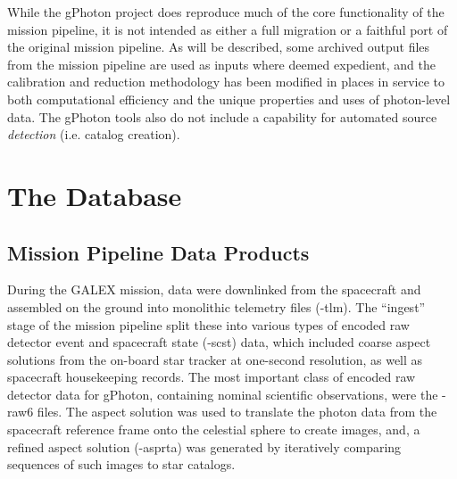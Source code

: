 \documentclass[iop]{emulateapj}
\begin{document}
While the gPhoton project does reproduce much of the core functionality of the mission pipeline, it is not intended as either a full migration or a faithful port of the original mission pipeline. As will be described, some archived output files from the mission pipeline are used as inputs where deemed expedient, and the calibration and reduction methodology has been modified in places in service to both computational efficiency and the unique properties and uses of photon-level data. The gPhoton tools also do not include a capability for automated source \emph{detection} (i.e. catalog creation).

\section{The Database}
\label{database}
\subsection{Mission Pipeline Data Products}
During the GALEX mission, data were downlinked from the spacecraft and assembled on the ground into monolithic telemetry files (-tlm). The ``ingest'' stage of the mission pipeline split these into various types of encoded raw detector event and spacecraft state (-scst) data, which included coarse aspect solutions from the on-board star tracker at one-second resolution, as well as spacecraft housekeeping records. The most important class of encoded raw detector data for gPhoton, containing nominal scientific observations, were the -raw6 files. The aspect solution was used to translate the photon data from the spacecraft reference frame onto the celestial sphere to create images, and, a refined aspect solution (-asprta) was generated by iteratively comparing sequences of such images to star catalogs.
\end{document}
